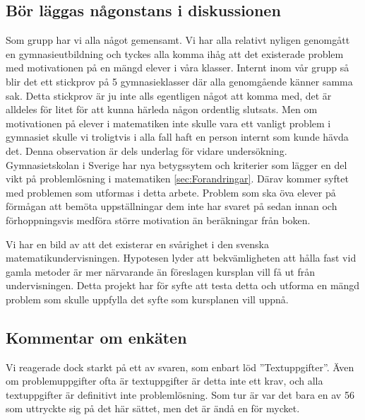 \subsection{Bör läggas någonstans i diskussionen}

\textcolor{WildStrawberry}{
    Som grupp har vi alla något gemensamt. Vi har alla relativt nyligen genomgått en gymnasieutbildning och tyckes alla komma ihåg att det existerade problem med motivationen på en mängd elever i våra klasser. Internt inom vår grupp så blir det ett stickprov på 5 gymnasieklasser där alla genomgående känner samma sak. Detta stickprov är ju inte alls egentligen något att komma med, det är alldeles för litet för att kunna härleda någon ordentlig slutsats. Men om motivationen på elever i matematiken inte skulle vara ett vanligt problem i gymnasiet skulle vi troligtvis i alla fall haft en person internt som kunde hävda det. Denna observation är dels underlag för vidare undersökning. Gymnasietskolan i Sverige har nya betygssytem och kriterier som lägger en del vikt på problemlösning i matematiken \ref{sec:Forandringar}. Därav kommer syftet med problemen som utformas i detta arbete. Problem som ska öva elever på förmågan att bemöta uppställningar dem inte har svaret på sedan innan och förhoppningsvis medföra större motivation än beräkningar från boken.
}

\textcolor{WildStrawberry}{
    Vi har en bild av att det existerar en svårighet i den svenska matematikundervisningen. Hypotesen lyder att bekvämligheten att hålla fast vid gamla metoder är mer närvarande än föreslagen kursplan vill få ut från undervisningen. Detta projekt har för syfte att testa detta och utforma en mängd problem som skulle uppfylla det syfte som kursplanen vill uppnå. }
    
\subsection{Kommentar om enkäten}
    \textcolor{lila}{Vi reagerade dock starkt på ett av svaren, som enbart löd ''Textuppgifter''. Även om problemuppgifter ofta är textuppgifter är detta inte ett krav, och alla textuppgifter är definitivt inte problemlösning. Som tur är var det bara en av 56 som uttryckte sig på det här sättet, men det är ändå en för mycket.}